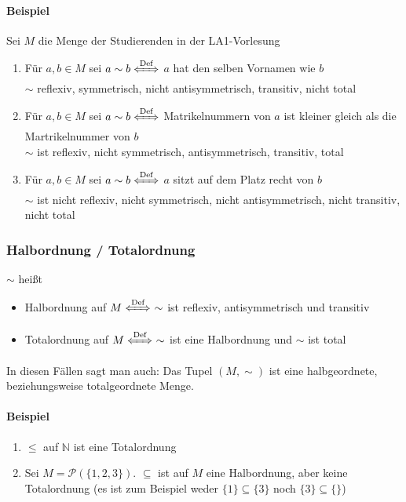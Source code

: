 \documentclass[a4paper]{scrartcl}
\theoremstyle{definition}
\theoremstyle{plain}
\theoremstyle{plain}
\theoremstyle{remark}
\theoremstyle{remark}
\theoremstyle{remark}
\theoremstyle{remark}
\theoremstyle{remark}
\begin{document}
\paragraph{Beispiel}
\label{sec-2-5-2-1}
Sei $M$ die Menge der Studierenden in der LA1-Vorlesung
\begin{enumerate}
\item Für $a,b \in M$ sei $a\sim b \xLeftrightarrow{\text{Def}}$ $a$ hat den selben Vornamen wie $b$ \\
                $\sim$ reflexiv, symmetrisch, nicht antisymmetrisch, transitiv, nicht total
\item Für $a,b \in M$ sei $a\sim b \xLeftrightarrow{\text{Def}}$ Matrikelnummern von $a$ ist kleiner gleich als die Martrikelnummer von $b$ \\
                $\sim$ ist reflexiv, nicht symmetrisch, antisymmetrisch, transitiv, total
\item Für $a,b \in M$ sei $a\sim b \xLeftrightarrow{\text{Def}}$ $a$ sitzt auf dem Platz recht von $b$ \\
                $\sim$ ist nicht reflexiv, nicht symmetrisch, nicht antisymmetrisch, nicht transitiv, nicht total
\end{enumerate}
\subsubsection{Halbordnung / Totalordnung}
\label{sec-2-5-3}
$\sim$ heißt
\begin{itemize}
\item Halbordnung auf $M\xLeftrightarrow{\text{Def}}~\sim$ ist reflexiv, antisymmetrisch und transitiv
\item Totalordnung auf $M\xLeftrightarrow{\text{Def}}~\sim$ ist eine Halbordnung und $\sim$ ist total
\end{itemize}
In diesen Fällen sagt man auch: Das Tupel $(M,\sim)$ ist eine halbgeordnete, beziehungsweise totalgeordnete Menge.
\paragraph{Beispiel}
\label{sec-2-5-3-1}
\begin{enumerate}
\item $\leq$ auf $\mathbb{N}$ ist eine Totalordnung
\item Sei $M = \mathcal{P}(\{1,2,3\})$. $\subseteq$ ist auf $M$ eine Halbordnung, aber keine Totalordnung (es ist zum Beispiel weder $\{1\} \subseteq \{3\}$ noch $\{3\}\subseteq \{\}$)
\end{enumerate}
\end{document}
